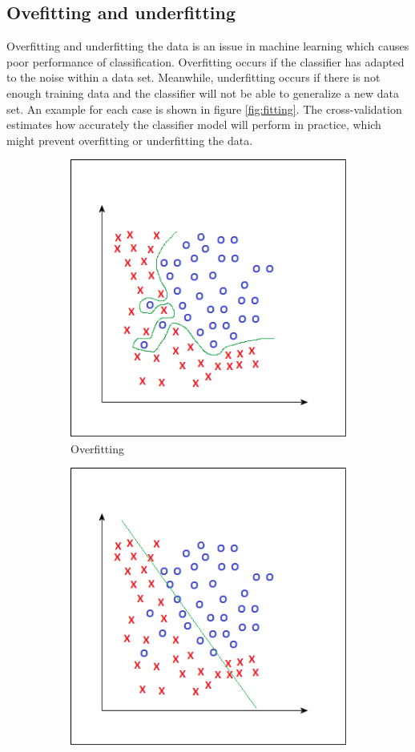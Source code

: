 \documentclass[USenglish]{ifimaster}  %
\begin{document}
\subsection{Ovefitting and underfitting}
Overfitting and underfitting the data is an issue in machine learning which causes poor performance of classification. Overfitting occurs if the classifier has adapted to the noise within a data set. Meanwhile, underfitting occurs if there is not enough training data and the classifier will not be able to generalize a new data set. An example for each case is shown in figure \ref{fig:fitting}. The cross-validation estimates how accurately the classifier model will perform in practice, which might prevent overfitting or underfitting the data.

	\begin{figure}[h]
		\begin{subfigure}{0.5\linewidth}
			\centering
			\includegraphics[scale=0.43]{Figures/Overfitting}
			\caption{Overfitting}
			\label{fig:over}
		\end{subfigure}%
		\begin{subfigure}{.5\linewidth}
			\centering
			\includegraphics[scale=0.43]{Figures/Underfitting}

\end{subfigure}
\end{figure}
\end{document}
